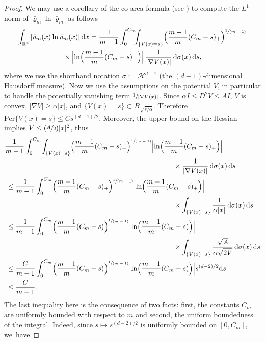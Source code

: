 \documentclass[JEP,XML,SOM,Unicode,published]{cedram}
\newcommand{\Psfrac}[2]{(\sfrac{#1}{#2})}
\newcommand{\spfrac}[2]{\sfrac{#1}{(#2)}}
\newcommand{\Bprt}[1]{\Bigl(#1\Bigr)}
\newcommand{\dx}[1]{\mathop{}\!\mathrm{d} #1}
\newcommand{\R}{\mathbb{R}}
\theoremstyle{plain}
\theoremstyle{remark}
\begin{document}
\begin{proof}
We may use a corollary of the co-area formula (see \cite[\S 3.4.4, Prop.\,3]{EvaGar}) to compute the $L^1$-norm of $\bar\varrho_m \ln \bar\varrho_m$ as follows
\begin{multline*}
\int_{\R^d} |\bar\varrho_m(x) \ln \bar\varrho_m(x)| \dx x
= \frac{1}{m-1}\int_0^{C_m}\!\!\! \int_{\{V(x)={s}\}}\Bprt{\frac{m-1}{m}(C_m -{s})_+}^{\spfrac{1}{m-1}}\\
{}\times\Bigl|\ln \Bprt{\frac{m-1}{m}(C_m -{s})_+} \Bigr|\,\frac{1}{|\nabla V(x)|} \dx{\sigma(x)} \dx {s},
\end{multline*}
where we use the shorthand notation $\sigma:=\mathcal{H}^{d-1}$ (the $(d-1)$-dimensional Hausdorff measure).
Now we use the assumptions on the potential $V$, in particular to handle the potentially vanishing term $\sfrac{1}{|\nabla V(x)|}$. Since $\alpha I \leq D^2 V\leq A I$, $V$ is convex, $|\nabla V|\geq \alpha |x|$, and $\{V(x)={s}\}\subset B_{\sqrt{{s}/\alpha}}$. Therefore $\mathrm{Per}\{V(x)={s}\} \leq C {s}^{(d-1)/2}$. Moreover, the upper bound on the Hessian implies $V\leq \Psfrac A 2 |x|^2$, thus
\begin{align*}
& \frac{1}{m-1}\int_0^{C_m}\! \int_{\{V(x)={s}\}} \Bprt{\frac{m-1}{m}(C_m -{s})_+}^{\spfrac{1}{m-1}} \Bigl|\ln \Bprt{\frac{m-1}{m}(C_m -{s})_+} \Bigr|\\
&\hspace*{8.5cm}{}\times\frac{1}{|\nabla V(x)|} \dx{\sigma(x)} \dx {s} \\
&\:\leq \frac{1}{m-1}\int_0^{C_m} \Bprt{\frac{m-1}{m}(C_m -{s})_+}^{\spfrac{1}{m-1}} \Bigl|\ln \Bprt{\frac{m-1}{m}(C_m -{s})_+} \Bigr|\\
&\hspace*{8.5cm}{}\times \int_{\{V(x)={s}\}} \frac{1}{\alpha |x|} \dx{\sigma(x)}\dx {s}\\
&\:\leq \frac{1}{m-1}\int_0^{C_m} \Bprt{\frac{m-1}{m}(C_m -{s})}^{\spfrac{1}{m-1}} \Bigl|\ln \Bprt{\frac{m-1}{m}(C_m -{s})} \Bigr|\\
&\hspace*{8.5cm}{}\times\int_{\{V(x)={s}\}} \frac{\sqrt{A }}{\alpha\sqrt{2{V}}}\dx{\sigma(x)}\dx {s}\\
&\:\leq \frac{C}{m-1}\int_0^{C_m} \Bprt{\frac{m-1}{m}(C_m -{s})}^{\spfrac{1}{m-1}} \Bigl|\ln \Bprt{\frac{m-1}{m}(C_m -{s})} \Bigr| {s}^{(d-2)/2} {\dx {s}}\\
&\:\leq \frac{C}{m-1}.
\end{align*}
The last inequality here is the consequence of two facts: first, the constants $C_{m}$ are uniformly bounded with respect to $m$ and second, the uniform boundedness of the integral. Indeed, since $s\mapsto s^{(d-2)/2}$ is uniformly bounded on $[0,C_{m}]$, we~have

\end{proof}
\end{document}

